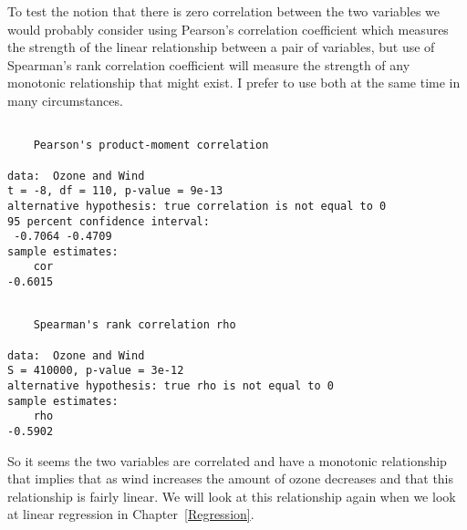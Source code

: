 To test the notion that there is zero correlation between the two variables we would probably consider using Pearson's correlation coefficient which measures the strength of the linear relationship between a pair of variables, but use of Spearman's rank correlation coefficient will measure the strength of any monotonic relationship that might exist. I prefer to use both at the same time in many circumstances. 
\begin{knitrout}
\color{fgcolor}\begin{kframe}
\begin{alltt}
\hlstd{> }
\hlstd{> }
\end{alltt}
\begin{verbatim}

	Pearson's product-moment correlation

data:  Ozone and Wind
t = -8, df = 110, p-value = 9e-13
alternative hypothesis: true correlation is not equal to 0
95 percent confidence interval:
 -0.7064 -0.4709
sample estimates:
    cor 
-0.6015 
\end{verbatim}
\begin{alltt}
\hlstd{> } \hlstd{=}\hlstd{)}
\end{alltt}


{\ttfamily\noindent{}}\begin{verbatim}

	Spearman's rank correlation rho

data:  Ozone and Wind
S = 410000, p-value = 3e-12
alternative hypothesis: true rho is not equal to 0
sample estimates:
    rho 
-0.5902 
\end{verbatim}
\begin{alltt}
\hlstd{> }
\end{alltt}
\end{kframe}
\end{knitrout}
So it seems the two variables are correlated and have a monotonic relationship that implies that as wind increases the amount of ozone decreases and that this relationship is fairly linear. We will look at this relationship again when we look at linear regression in Chapter~\ref{Regression}. 
 
 
 
